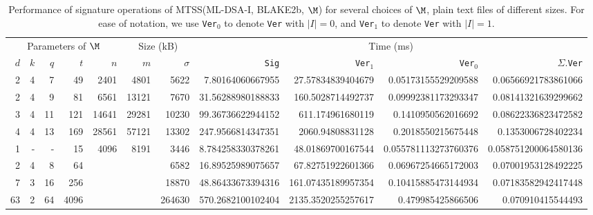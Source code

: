 
    \begin{table*}[htbp]
        \setlength{\tabcolsep}{10pt}
        \centering
        \caption{Performance of signature operations of MTSS(ML-DSA-I, BLAKE2b, $\M$) for several choices of $\M$,
plain text files of different sizes. For ease of notation, we use \texttt{Ver$_0$} to denote \texttt{Ver} with $|I| = 
0$, and \texttt{Ver$_1$} to denote \texttt{Ver} with $|I| = 1$.}
        \begin{tabular}{rrrrrrrrrrr}
            \toprule
            \multicolumn{5}{c}{Parameters of $\M$} & \multicolumn{2}{c}{Size  (kB)} & \multicolumn{4}{c}{Time (ms)} 
            \\
            \cmidrule(lr){1-5} \cmidrule(lr){6-7} \cmidrule(lr){8-11}
            $d$ & $k$ & $q$ & $t$ & $n$ & $m$ & $\sigma$ & \texttt{Sig} & \texttt{Ver$_1$} & \texttt{Ver$_0$} &
            $\Sigma$.\texttt{Ver} \\
            \midrule
    	2 & 4 & 7 & 49 & 2401 & 4801 & 5622 & 7.80164060667955 & 27.57834839404679 &0.05173155529209588 & 0.06566921783861066 \\
	2 & 4 & 9 & 81 & 6561 & 13121 & 7670 & 31.56288980188833 & 160.5028714492737 &0.09992381173293347 & 0.08141321639299662 \\
	3 & 4 & 11 & 121 & 14641 & 29281 & 10230 & 99.36736622944152 & 611.174961680119 &0.1410950562016692 & 0.08622336823472582 \\
	4 & 4 & 13 & 169 & 28561 & 57121 & 13302 & 247.9566814347351 & 2060.94808831128 &0.2018550215675448 & 0.1353006728402234 \\
	\midrule

                    	1 & - & - & 15 & \multirow{4}{*}{4096} & \multirow{4}{*}{8191} & 3446 & 8.784258330378261 & 48.01869700167544 & 0.055781113273760376 & 0.058751200064580136 \\
                    	2 & 4 & 8 & 64 &  &  & 6582 & 16.89525989075657 & 67.82751922601366 & 0.06967254665172003 &0.07001953128492225 \\
	7 & 3 & 16 & 256 &  &  & 18870 & 48.86433673394316 & 161.07435189957354 & 0.10415885473144934 &0.07183582942417448 \\
	63 & 2 & 64 & 4096 &  &  & 264630 & 570.2682100102404 & 2135.3520255257617 & 0.479985425866506 &0.070910415544493 \\

        \bottomrule
      \end{tabular}
      \label{table:sign-locate-different-parameters}
    \end{table*}
    